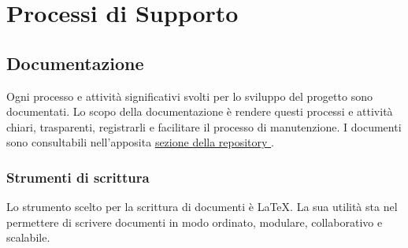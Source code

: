 \section{Processi di Supporto}
	\subsection{Documentazione}
		Ogni processo e attività significativi svolti per lo sviluppo del progetto sono documentati. Lo scopo della documentazione è rendere questi processi e attività chiari, trasparenti, registrarli e facilitare il processo di manutenzione. I documenti sono consultabili nell'apposita \href {https://github.com/8LabSolutions/Soldino}{ \underline{sezione della repository} }. 
		\subsubsection{Strumenti di scrittura}
		Lo strumento scelto per la scrittura di documenti è \LaTeX. La sua utilità sta nel permettere di scrivere documenti in modo ordinato, modulare, collaborativo e scalabile.
